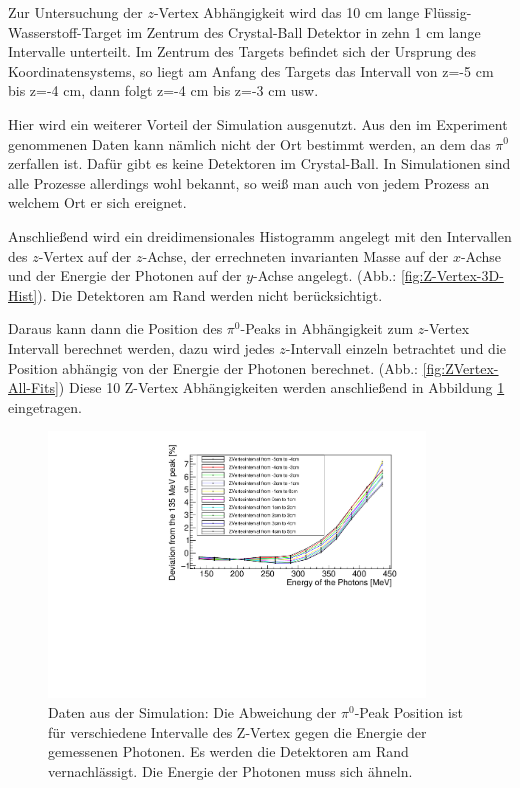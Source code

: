 \documentclass[a4paper,11pt,oneside,final,german,openbib,pdftex]{scrbook}
\begin{document}
{Zur Untersuchung der $z$-Vertex Abhängigkeit wird das 10 cm lange Fl\"ussig-Wasserstoff-Target im Zentrum des Crystal-Ball Detektor in zehn 1 cm lange Intervalle unterteilt. 
Im Zentrum des Targets befindet sich der Ursprung des Koordinatensystems, so liegt am Anfang des Targets das Intervall von z=-5 cm bis z=-4 cm, dann folgt z=-4 cm bis z=-3 cm usw. 

Hier wird ein weiterer Vorteil der Simulation ausgenutzt. Aus den im Experiment genommenen Daten kann n\"amlich nicht der Ort bestimmt werden, an dem das $\pi^0$ zerfallen ist. Daf\"ur gibt es keine Detektoren im Crystal-Ball. In Simulationen sind alle Prozesse allerdings wohl bekannt, so wei{\ss} man auch von jedem Prozess an welchem Ort er sich ereignet. 

Anschließend wird ein dreidimensionales Histogramm angelegt mit den Intervallen des $z$-Vertex auf der $z$-Achse, der errechneten invarianten Masse auf der $x$-Achse und der Energie der Photonen auf der $y$-Achse angelegt. (Abb.: \ref{fig:Z-Vertex-3D-Hist}). Die Detektoren am Rand werden nicht ber\"ucksichtigt.

Daraus kann dann die Position des $\pi^0$-Peaks in Abhängigkeit zum $z$-Vertex Intervall berechnet werden, dazu wird jedes $z$-Intervall einzeln betrachtet und die Position abhängig von der Energie der Photonen berechnet. (Abb.: \ref{fig:ZVertex-All-Fits})
Diese 10 Z-Vertex Abhängigkeiten werden anschließend in Abbildung \ref{fig:Z-Vertex-Multi-Graph} eingetragen.

\begin{figure}[h!]
	\begin{center}
		\includegraphics[width=100mm]{20172804MCZVertexDeviation}
		\caption[Simulation: Symmetrische Photonen; Abweichung f\"ur verschiedene Z-Vertices]{Daten aus der Simulation: Die Abweichung der $\pi^0$-Peak Position ist für verschiedene Intervalle des Z-Vertex gegen die Energie der gemessenen Photonen. Es werden die Detektoren am Rand vernachl\"assigt. Die Energie der Photonen muss sich \"ahneln.}
		\label{fig:Z-Vertex-Multi-Graph}
	\end{center}
\end{figure}

}
\end{document}
